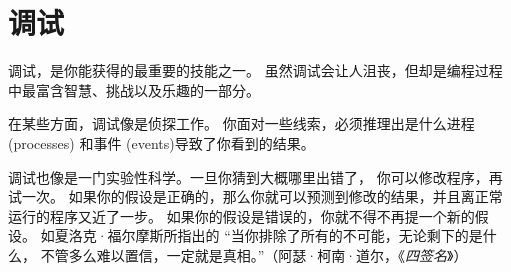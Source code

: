 %
\section{调试}
\index{debug]}  


调试，是你能获得的最重要的技能之一。
虽然调试会让人沮丧，但却是编程过程中最富含智慧、挑战以及乐趣的一部分。
  


在某些方面，调试像是侦探工作。
你面对一些线索，必须推理出是什么进程 (processes) 和事件 (events)导致了你看到的结果。


调试也像是一门实验性科学。一旦你猜到大概哪里出错了，
你可以修改程序，再试一次。
如果你的假设是正确的，那么你就可以预测到修改的结果，并且离正常运行的程序又近了一步。
如果你的假设是错误的，你就不得不再提一个新的假设。
如夏洛克·福尔摩斯所指出的 ``当你排除了所有的不可能，无论剩下的是什么，
不管多么难以置信，一定就是真相。''（阿瑟·柯南·道尔，《{\em 四签名}》）
  


